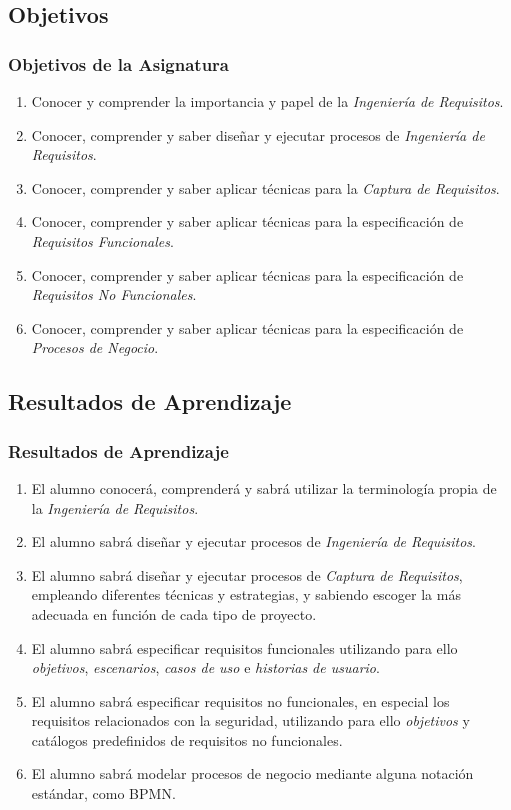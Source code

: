 \documentclass[a4paper,slidestop,xcolor=pst,dvips,blue]{beamer}
\begin{document}
\subsection{Objetivos}

\begin{frame}[t]
	\frametitle{Objetivos de la Asignatura}
    \begin{enumerate}
			\item<1-> Conocer y comprender la importancia y papel de la \emph{Ingeniería de Requisitos}.
            \item<2-> Conocer, comprender y saber diseñar y ejecutar procesos de \emph{Ingeniería de Requisitos}.
			\item<3-> Conocer, comprender y saber aplicar técnicas para la \emph{Captura de Requisitos}.
			\item<4-> Conocer, comprender y saber aplicar técnicas para la especificación de \emph{Requisitos Funcionales}.
			\item<5-> Conocer, comprender y saber aplicar técnicas para la especificación de \emph{Requisitos No Funcionales}.
			\item<6-> Conocer, comprender y saber aplicar técnicas para la especificación de \emph{Procesos de Negocio}.
	 \end{enumerate}
\end{frame}

\subsection{Resultados de Aprendizaje}

\begin{frame}[t]
	\frametitle{Resultados de Aprendizaje}
    	\begin{enumerate}
			\item<1-> El alumno conocerá, comprenderá y sabrá utilizar la terminología propia de la \emph{Ingeniería de Requisitos}.
			\item<2-> El alumno sabrá diseñar y ejecutar procesos de \emph{Ingeniería de Requisitos}.
            \item<3-> El alumno sabrá diseñar y ejecutar procesos de \emph{Captura de Requisitos}, empleando diferentes técnicas y estrategias, y sabiendo escoger la más adecuada en función de cada tipo de proyecto.
            \item<4-> El alumno sabrá especificar requisitos funcionales utilizando para ello \emph{objetivos}, \emph{escenarios}, \emph{casos de uso} e \emph{historias de usuario}.
            \item<5-> El alumno sabrá especificar requisitos no funcionales, en especial los requisitos relacionados con la seguridad, utilizando para ello \emph{objetivos} y catálogos predefinidos de requisitos no funcionales.
            \item<6-> El alumno sabrá modelar procesos de negocio mediante alguna notación estándar, como BPMN.
		\end{enumerate}
\end{frame}
\end{document}
